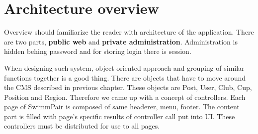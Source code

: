 \chapter{Architecture overview}
Overview should familiarize the reader with architecture of the application. There are two parts, \textbf{public web} and \textbf{private administration}. Administration is hidden behing password and for storing login there is session. 
\par
When designing such system, object oriented approach and grouping of similar functions together is a good thing. There are objects that have to move around the CMS described in previous chapter. These objects are Post, User, Club, Cup, Position and Region. Therefore we came up with a concept of controllers. Each page of SwimmPair is composed of same headerer, menu, footer. The content part is filled with page's specific results of controller call put into UI. These controllers must be distributed for use to all pages.
